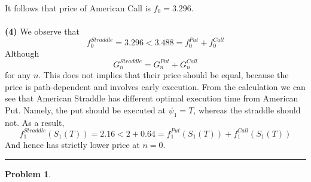 \documentclass[a4paper, 10pt]{article}
\theoremstyle{definition}
\newtheorem{problem}{Problem}
\theoremstyle{hSol}
\begin{document}
It follows that price of American Call is $f_0 = 3.296$. \\
~\\
\textbf{(4)} We observe that 
$$
f_0^{Straddle} = 3.296 < 3.488 = f_0^{Put} + f_0^{Call}
$$
Although
$$
G_n^{Straddle} = G_n^{Put} + G_n^{Call}
$$
for any $n$. This does not implies that their price should be equal, because the price is path-dependent and involves early execution. From the calculation we can see that American Straddle has different optimal execution time from American Put. Namely, the put should be executed at $\psi_1 = T$, whereas the straddle should not. As a result, 
$$
f_1^{Straddle}(S_1(T)) = 2.16 < 2 + 0.64 = f_1^{Put}(S_1(T)) + f_1^{Call}(S_1(T))
$$
And hence has strictly lower price at $n=0$.

\noindent\rule{16cm}{0.4pt}
\begin{problem} 
\end{problem}
\end{document}
